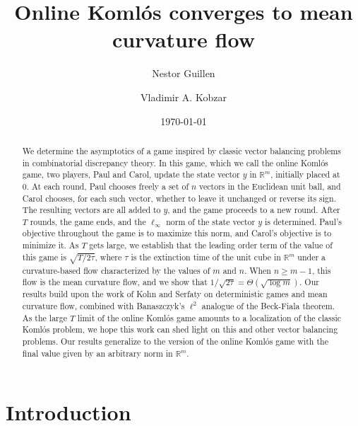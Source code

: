 \documentclass[reqno]{amsart}
\author{Nestor Guillen}
\author{Vladimir A. Kobzar}
\title{Online  Koml\'os converges to mean curvature flow}
\date{\today}
\numberwithin{equation}{section}
\newcommand{\R}{\mathbb R}
\begin{document}
\begin{abstract}

We determine the asymptotics of a game inspired by classic vector balancing problems in combinatorial discrepancy theory.  In this game, which we call  the online Koml\'os game, two players, Paul and Carol, update the state vector $y$ in  $\mathbb{R}^m$, initially placed at $0$. At each round, Paul chooses freely a set of $n$ vectors in the Euclidean unit ball, and   Carol chooses, for each such vector, whether to leave  it unchanged or reverse its sign. The resulting vectors are all added to  $y$, and the game proceeds to a new round.  After $T$ rounds, the game ends, and the $\ell_\infty$ norm of the state vector $y$ is determined. Paul's objective throughout the game is  to maximize this norm, and  Carol's objective is to minimize it. As $T$ gets large, we establish that the leading order term of the value of this game is $\sqrt{T/2\tau}$, where $\tau$ is the extinction time of the unit cube in $\mathbb{R}^m$ under a curvature-based flow characterized by the values of $m$ and $n$. When $n\geq m-1$, this flow is the mean curvature flow, and we show that $1/\sqrt{2\tau} =\Theta(\sqrt{\log m})$.   Our results build upon the work of Kohn and Serfaty on deterministic games and mean curvature flow, combined with Banaszczyk's $\ell^2$ analogue of the Beck-Fiala theorem. As the large $T$ limit of the online Koml\'os game amounts to a localization of the  classic Koml\'os problem, we hope this work can shed light on this and other vector balancing problems. Our results generalize to  the version of the online  Koml\'os game with the final value given by an arbitrary norm in $\R^m$.


\end{abstract}

\maketitle

\section{Introduction}\label{sec:intro}
\end{document}
